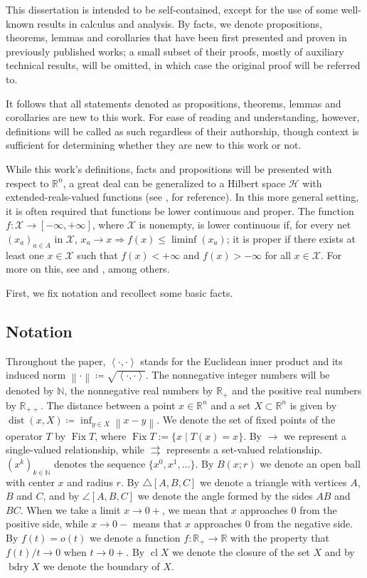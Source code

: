 \documentclass[smallextended,numbook,nospthms]{svjour3}
\theoremstyle{plain}
\theoremstyle{definition}
\def\RR{\mathds R}
\def\NN{\mathds N}
\DeclareMathOperator{\Fix}{Fix}
\DeclareMathOperator{\dist}{dist}
\newcommand{\norm}[1]{\left\lVert#1\right\rVert}
\newcommand{\scal}[2]{\left\langle{#1},{#2}  \right\rangle}
\begin{document}
This dissertation is intended to be self-contained, except for the use of some well-known results in calculus and analysis. By facts, we denote propositions, theorems, lemmas and corollaries that have been first presented and proven in previously published works; a small subset of their proofs, mostly of auxiliary technical results, will be omitted, in which case the original proof will be referred to.

It follows that all statements denoted as propositions, theorems, lemmas and corollaries are new to this work. For ease of reading and understanding, however, definitions will be called as such regardless of their authorship, though context is sufficient for determining whether they are new to this work or not.

While this work's definitions, facts and propositions will be presented with respect to $\RR^n$, a great deal can be generalized to a Hilbert space $\mathcal{H}$ with extended-reals-valued functions (see \cite{BC2011, Rockafellar:1996}, for reference). In this more general setting, it is often required that functions be lower continuous and proper. The function $f:\mathcal{X} \rightarrow [-\infty,+\infty]$, where $\mathcal{X}$ is nonempty, is lower continuous if, for every net $\left(x_{a}\right)_{a \in A}$ in $\mathcal{X}$, $x_{a} \rightarrow x \Rightarrow f(x) \leq \liminf \left(x_{a}\right)$; it is proper if there exists at least one $x \in \mathcal{X}$ such that  $f(x)<+\infty$ and $f(x)>-\infty$ for all $x \in \mathcal{X}$.  For more on this, see \cite[Sections 7 and 30]{Rockafellar:1996} and \cite[Chapter 1 and 9]{BC2011}, among others.

First, we fix notation and recollect some basic facts. 
\subsection{Notation}
Throughout the paper, $\scal{\cdot}{\cdot}$ stands for the Euclidean inner product and its induced  norm $\norm{\cdot}\coloneqq\sqrt{\scal{\cdot}{\cdot}}$. The nonnegative integer numbers will be denoted by $\NN$, the nonnegative real numbers by $\RR_{+}$ and the positive real numbers by $\RR_{++}$. The distance between a point $x\in\RR^{n}$ and a set $X\subset \RR^{n}$ is given by $\dist(x,X)\coloneqq \inf_{y\in X} \norm{x-y}$. We denote the set of fixed points of the operator $T$ by $\Fix T$, where $\Fix T := \{x \mid T(x)=x\}$. By $\rightarrow$ we represent a single-valued relationship, while $\rightrightarrows$ represents a set-valued relationship. $(x^k)_{k \in \NN}$ denotes the sequence $\{x^0, x^1, \ldots\}$. By $B(x;r)$ we denote an open ball with center $x$ and radius $r$. By $\triangle{[A, B, C]}$ we denote a triangle with vertices $A$, $B$ and $C$, and by $\angle{[A, B, C]}$ we denote the angle formed by the sides $AB$ and $BC$. When we take a limit $x \rightarrow 0+$, we mean that $x$ approaches 0 from the positive side, while $x \rightarrow 0-$ means that $x$ approaches 0 from the negative side. By $f(t)=o(t)$ we denote a function $f:\RR_{+} \rightarrow \RR$ with the property that $f(t)/t \rightarrow 0$ when $t \rightarrow 0+$. By $\operatorname{cl} X$ we denote the closure of the set $X$ and by $\operatorname{bdry} X$ we denote the boundary of $X$.
\end{document}
